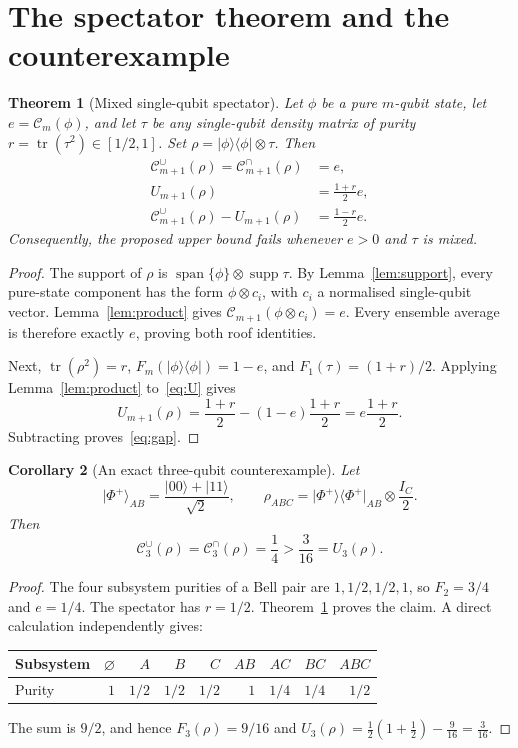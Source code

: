 \documentclass[11pt,a4paper]{article}
\newtheorem{theorem}{Theorem}
\newtheorem{corollary}[theorem]{Corollary}
\newcommand{\tr}{\operatorname{tr}}
\newcommand{\supp}{\operatorname{supp}}
\newcommand{\CE}{\mathcal C}
\newcommand{\ket}[1]{\lvert #1\rangle}
\newcommand{\bra}[1]{\langle #1\rvert}
\newcommand{\proj}[1]{\ket{#1}\bra{#1}}
\begin{document}
\section{The spectator theorem and the counterexample}
\begin{theorem}[Mixed single-qubit spectator]\label{thm:spectator}
Let $\phi$ be a pure $m$-qubit state, let $e=\CE_m(\phi)$, and let $\tau$ be any single-qubit density matrix of purity $r=\tr(\tau^2)\in[1/2,1]$. Set $\rho=\proj\phi\otimes\tau$. Then
\begin{align}
 \CE_{m+1}^\cup(\rho)=\CE_{m+1}^\cap(\rho)&=e,\label{eq:roofexact}\\
 U_{m+1}(\rho)&=\frac{1+r}{2}e,\label{eq:Uexact}\\
 \CE_{m+1}^\cup(\rho)-U_{m+1}(\rho)&=\frac{1-r}{2}e.\label{eq:gap}
\end{align}
Consequently, the proposed upper bound fails whenever $e>0$ and $\tau$ is mixed.
\end{theorem}
\begin{proof}
The support of $\rho$ is $\operatorname{span}\{\phi\}\otimes\supp\tau$. By Lemma~\ref{lem:support}, every pure-state component has the form $\phi\otimes c_i$, with $c_i$ a normalised single-qubit vector. Lemma~\ref{lem:product} gives $\CE_{m+1}(\phi\otimes c_i)=e$. Every ensemble average is therefore exactly $e$, proving both roof identities.

Next, $\tr(\rho^2)=r$, $F_m(\proj\phi)=1-e$, and $F_1(\tau)=(1+r)/2$. Applying Lemma~\ref{lem:product} to~\eqref{eq:U} gives
\[
 U_{m+1}(\rho)=\frac{1+r}{2}-(1-e)\frac{1+r}{2}
             =e\frac{1+r}{2}.
\]
Subtracting proves~\eqref{eq:gap}.
\end{proof}

\begin{corollary}[An exact three-qubit counterexample]\label{cor:bell}
Let
\[
 \ket{\Phi^+}_{AB}=\frac{\ket{00}+\ket{11}}{\sqrt2},
 \qquad \rho_{ABC}=\proj{\Phi^+}_{AB}\otimes\frac{I_C}{2}.
\]
Then
\begin{equation}\label{eq:witness}
 \CE_3^\cup(\rho)=\CE_3^\cap(\rho)=\frac14
  >\frac3{16}=U_3(\rho).
\end{equation}
\end{corollary}
\begin{proof}
The four subsystem purities of a Bell pair are $1,1/2,1/2,1$, so $F_2=3/4$ and $e=1/4$. The spectator has $r=1/2$. Theorem~\ref{thm:spectator} proves the claim. A direct calculation independently gives:
\begin{center}
\begin{tabular}{@{}lrrrrrrrr@{}}
\toprule
Subsystem & $\varnothing$ & $A$ & $B$ & $C$ & $AB$ & $AC$ & $BC$ & $ABC$\\
\midrule
Purity & $1$ & $1/2$ & $1/2$ & $1/2$ & $1$ & $1/4$ & $1/4$ & $1/2$\\
\bottomrule
\end{tabular}
\end{center}
The sum is $9/2$, and hence $F_3(\rho)=9/16$ and
$U_3(\rho)=\tfrac12(1+\tfrac12)-\tfrac9{16}=\tfrac3{16}$.
\end{proof}
\end{document}
